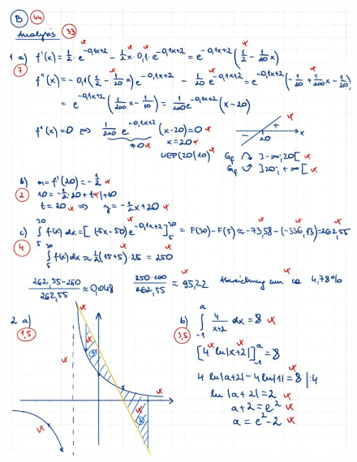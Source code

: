 \documentclass[a4paper,12pt]{article}
\begin{document}
\newpage
  \begin{figure}[H]
    \vspace{0cm}
    \centering
    \includegraphics[width=1.2\linewidth]{Q12_SA_240103_9.jpg}
  \end{figure}
\end{document}
